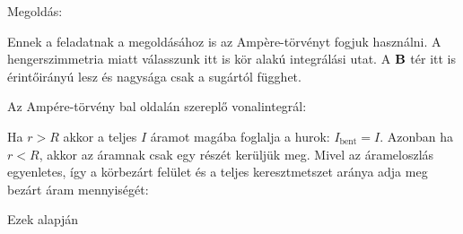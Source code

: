 
\ifdefined\megoldas

 Megoldás: 

 Ennek a feladatnak a megoldásához is az Amp\`ere-törvényt fogjuk használni. A hengerszimmetria miatt válasszunk itt is kör alakú integrálási utat. A $\mathbf{B}$ tér itt is érintőirányú lesz és nagysága csak a sugártól függhet. 

 Az Amp\'ere-törvény bal oldalán szereplő vonalintegrál:

 Ha $r>R$ akkor a teljes $I$ áramot magába foglalja a hurok: $I_\text{bent}=I$. Azonban ha $r<R$, akkor az áramnak csak egy részét kerüljük meg. Mivel az árameloszlás egyenletes, így a körbezárt felület és a teljes keresztmetszet aránya adja meg bezárt áram mennyiségét:

 Ezek alapján
 
\fi